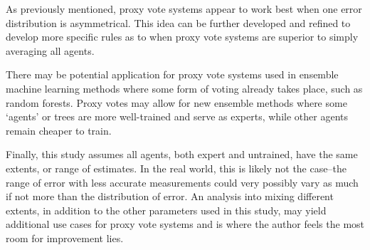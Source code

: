 As previously mentioned, proxy vote systems appear to work best when one error
distribution is asymmetrical.
This idea can be further developed and refined to develop more specific rules as to
when proxy vote systems are superior to simply averaging all agents.

There may be potential application for proxy vote systems used in ensemble machine
learning methods where some form of voting already takes place, such as random forests.
Proxy votes may allow for new ensemble methods where some `agents' or trees are more
well-trained and serve as experts, while other agents remain cheaper to train.

Finally, this study assumes all agents, both expert and untrained, have the same
extents, or range of estimates.
In the real world, this is likely not the case--the range of error with less accurate
measurements could very possibly vary as much if not more than the distribution of
error.
An analysis into mixing different extents, in addition to the other parameters used
in this study, may yield additional use cases for proxy vote systems and is where the
author feels the most room for improvement lies.
